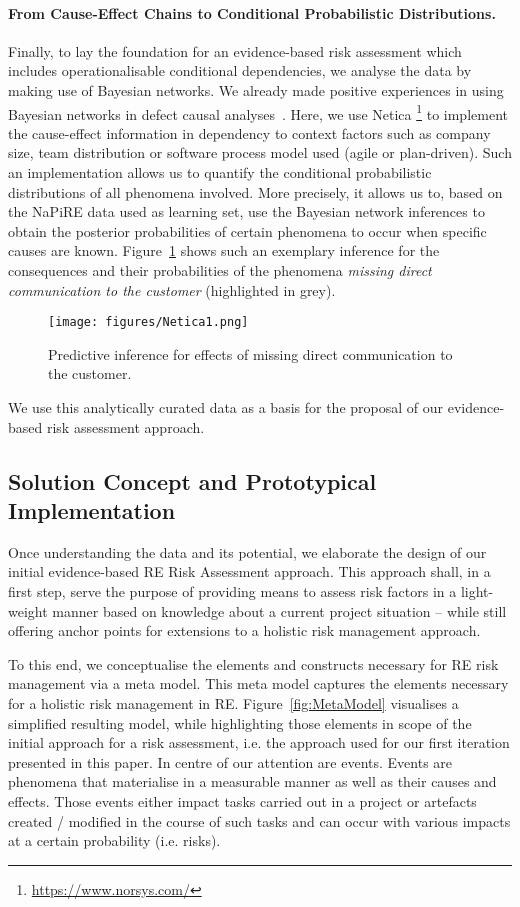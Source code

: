 \documentclass[lnbip]{svmultln}
\begin{document}
\paragraph{From Cause-Effect Chains to Conditional Probabilistic Distributions.}

Finally, to lay the foundation for an evidence-based risk assessment which includes operationalisable conditional dependencies, we analyse the data by making use of Bayesian networks. We already made positive experiences in using Bayesian networks in defect causal analyses~\cite{K++17}. Here, we use Netica \footnote{\url{https://www.norsys.com/}} to implement the cause-effect information in dependency to context factors such as company size, team distribution or software process model used (agile or plan-driven). Such an implementation allows us to quantify the conditional probabilistic distributions of all phenomena involved. More precisely, it allows us to, based on the NaPiRE data used as learning set, use the Bayesian network inferences to obtain the posterior probabilities of certain phenomena to occur when specific causes are known. Figure~\ref{fig:Netica} shows such an exemplary inference for the consequences and their probabilities of the phenomena \emph{missing direct communication to the customer} (highlighted in grey). 
\begin{figure}[!hbtp]
\centering
  \texttt{[image: figures/Netica1.png]}\\
  \caption{Predictive inference for effects of missing direct communication to the customer.}
  \label{fig:Netica}
\end{figure} 

We use this analytically curated data as a basis for the proposal of our evidence-based risk assessment approach.

\subsection{Solution Concept and Prototypical Implementation}
Once understanding the data and its potential, we elaborate the design of our initial evidence-based RE Risk Assessment approach. This approach shall, in a first step, serve the purpose of providing means to assess risk factors in a light-weight manner based on knowledge about a current project situation -- while still offering anchor points for extensions to a holistic risk management approach.

To this end, we conceptualise the elements and constructs necessary for RE risk management via a meta model. This meta model captures the elements necessary for a holistic risk management in RE. Figure~\ref{fig:MetaModel} visualises a simplified resulting model, while highlighting those elements in scope of the initial approach for a risk assessment, i.e. the approach used for our first iteration presented in this paper. In centre of our attention are events. Events are phenomena that materialise in a measurable manner as well as their causes and effects. Those events either impact tasks carried out in a project or artefacts created / modified in the course of such tasks and can occur with various impacts at a certain probability (i.e. risks). 
\end{document}
